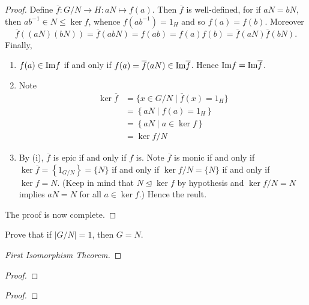 \documentclass[11pt,a4paper]{article}
\begin{document}
\begin{proof}
Define \(\overline{f}\colon G/N \to H: aN\mapsto f(a    )\).
Then \(\overline{f} \) is well-defined, for if \(aN = bN\), then \(ab^{-1}\in N\leq \ker f\), whence \(f(ab^{-1}) =  1_H\) and so \(f(a) = f(b)\).
Moreover \[\overline{f}((aN)(bN)) = \overline{f}(abN) = f(ab) = f(a)f(b) = \overline{f}(aN) \overline{f}(bN).\]
Finally, 
\begin{enumerate}[label=(\roman*)]
    \item  \(f(a)\in\text{Im} f \) if and only if  \(f(a) = \overline{f}(aN)  \in \text{Im} \overline{f} \). Hence \(\text{Im} f = \text{Im} \overline{f}\).
\item 
    Note 
    \begin{align*}
        \ker \overline{f} &= \{x\in G/N \mid \overline{f}(x) = 1_H\}\\
        &= \left\{  aN \mid f(a) = 1_H \right\}\\
        &= \left\{ aN \mid a\in \ker f \right\}\\
        &= \ker f / N
    \end{align*}

    \item By (i), \(\overline{f} \) is epic if and only if \(f\) is.
     Note 
    \(\overline{f}\) is monic if and only if \(\ker \overline{f} = \left\{ 1_{G/N} \right\}   = \{ N\} \) if and only if \(\ker f / N  = \{N\}\) if and only if \(\ker f = N\).
    (Keep in mind that \(N\unlhd \ker f\) by hypothesis and \(\ker f / N = N\)  implies \(aN  = N\) for all \(a \in \ker f\).) 
    Hence the reult.
\end{enumerate}
The proof is now complete.
\end{proof}


\begin{eje}
    Prove that if \(|G/N| = 1\), then \(G = N\).
\end{eje}


\begin{proof}[First Isomorphism Theorem]
    
\end{proof}

\begin{cor}
    
\end{cor}

\begin{proof}
    
\end{proof}

\begin{cor}
    
\end{cor}

\begin{proof}
    
\end{proof}
\end{document}
